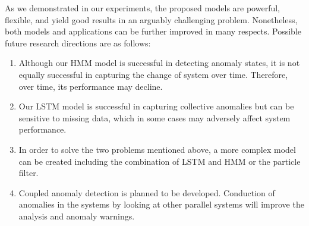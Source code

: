 As we demonstrated in our experiments, the proposed models are powerful, flexible, and yield good results in an arguably challenging problem. Nonetheless, both models and applications can be further improved in many respects. Possible future research directions are as follows:

\begin{enumerate}
    \item Although our HMM model is successful in detecting anomaly states, it is not equally successful in capturing the change of system over time. Therefore, over time, its performance may decline.
    \item Our LSTM model is successful in capturing collective anomalies but can be sensitive to missing data, which in some cases may adversely affect system performance.
    \item In order to solve the two problems mentioned above, a more complex model can be created including the combination of LSTM and HMM or the particle filter.
    \item Coupled anomaly detection is planned to be developed. Conduction of anomalies in the systems by looking at other parallel systems will improve the analysis and anomaly warnings.
\end{enumerate}

